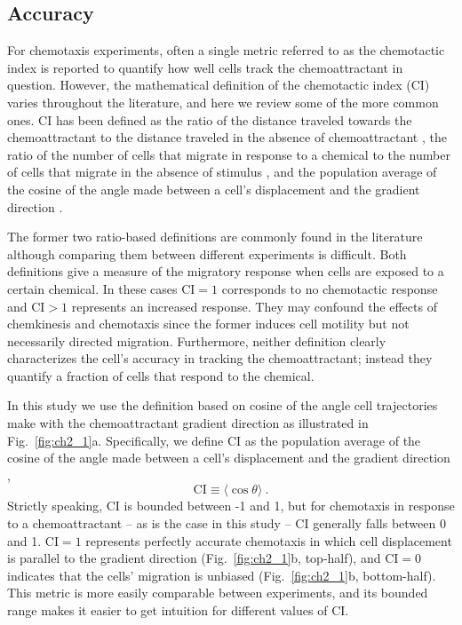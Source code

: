 \subsection{Accuracy}

For chemotaxis experiments, often a single metric referred to as the chemotactic index is reported to quantify how well cells track the chemoattractant in question. However, the mathematical definition of the chemotactic index (CI) varies throughout the literature, and here we review some of the more common ones. CI has been defined as the ratio of the distance traveled towards the chemoattractant to the distance traveled in the absence of chemoattractant \cite{nelson1975chemotaxis}, the ratio of the number of cells that migrate in response to a chemical to the number of cells that migrate in the absence of stimulus \cite{iellem2001unique,mayr2002vascular,fiedler2005vegf}, and the population average of the cosine of the angle made between a cell's displacement and the gradient direction
\cite{funamoto2001role,mouneimne2006spatial,van2007biased,kay2008changing}.

The former two ratio-based definitions are commonly found in the literature although comparing them between different experiments is difficult. Both definitions give a measure of the migratory response when cells are exposed to a certain chemical. In these cases $\text{CI} = 1$ corresponds to no chemotactic response and $\text{CI} > 1$ represents an increased response. They may confound the effects of chemkinesis and chemotaxis since the former induces cell motility but not necessarily directed migration. Furthermore, neither definition clearly characterizes the cell's accuracy in tracking the chemoattractant; instead they quantify a fraction of cells that respond to the chemical.

In this study we use the definition based on cosine of the angle cell trajectories make with the chemoattractant gradient direction as illustrated in Fig.\ \ref{fig:ch2_1}a. Specifically, we define CI as the population average of the cosine of the angle made between a cell's displacement and the gradient direction \cite{mouneimne2006spatial,kay2008changing,funamoto2001role},
\begin{equation}
    \text{CI} \equiv \langle \cos \theta \rangle \ .
\end{equation}
Strictly speaking, CI is bounded between -1 and 1, but for chemotaxis in response to a chemoattractant -- as is the case in this study -- CI generally falls between 0 and 1. $\text{CI} = 1$ represents perfectly accurate chemotaxis in which cell displacement is parallel to the gradient direction (Fig.\ \ref{fig:ch2_1}b, top-half), and $\text{CI} = 0$ indicates that the cells' migration is unbiased (Fig.\ \ref{fig:ch2_1}b, bottom-half). This metric is more easily comparable between experiments, and its bounded range makes it easier to get intuition for different values of CI.

